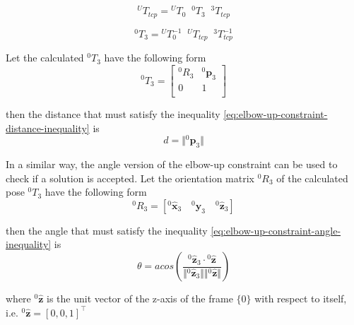 \begin{equation}
{}^UT_{tcp} = {}^UT_0  \;\;  {}^0T_3  \;\;   {}^3T_{tcp}
\end{equation}

\begin{equation}
{}^0T_3 = {}^UT_0^{-1}  \;\;  {}^UT_{tcp}  \;\;   {}^3T_{tcp}^{-1}
\end{equation}

Let the calculated ${}^0T_3$ have the following form
\begin{equation}
{}^0T_3 = \begin{bmatrix}
{}^0R_3 & {}^0\mathbf{p}_3 \\
0       & 1 \\
\end{bmatrix}
\end{equation}

then the distance that must satisfy the inequality \ref{eq:elbow-up-constraint-distance-inequality} is 
\begin{equation}
d = \Vert {}^0\mathbf{p}_3 \Vert
\end{equation}

In a similar way, the angle version of the elbow-up constraint can be used to check if a solution is accepted. Let the orientation matrix ${}^0R_3$ of the calculated pose ${}^0T_3$ have the following form
\begin{equation}
{}^0R_3 = [ {}^0\mathbf{\hat{x}}_3 \quad {}^0\mathbf{\hat{y}}_3 \quad {}^0\mathbf{\hat{z}}_3 ]
\end{equation}

then the angle that must satisfy the inequality \ref{eq:elbow-up-constraint-angle-inequality} is
\begin{equation}
θ = acos \left( \frac{ {}^0\mathbf{\hat{z}}_3 \cdot {}^0\mathbf{\hat{z}} }{ \Vert {}^0\mathbf{\hat{z}}_3 \Vert  \Vert {}^0\mathbf{\hat{z}} \Vert } \right)
\end{equation}

where ${}^0\mathbf{\hat{z}}$ is the unit vector of the z-axis of the frame $\lbrace 0 \rbrace$ with respect to itself, i.e. ${}^0\mathbf{\hat{z}} = [0, 0, 1]^\top$